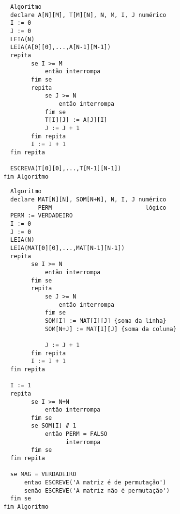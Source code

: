 \documentclass[10pt]{../notes}
\begin{document}
\pagebreak
{} 

\begin{lstlisting}
  Algoritmo
  declare A[N][M], T[M][N], N, M, I, J numérico
  I := 0
  J := 0
  LEIA(N)
  LEIA(A[0][0],...,A[N-1][M-1])
  repita
        se I >= M
            então interrompa
        fim se
        repita
            se J >= N
                então interrompa
            fim se
            T[I][J] := A[J][I] 
            J := J + 1
        fim repita        
        I := I + 1
  fim repita
  
  ESCREVA(T[0][0],...,T[M-1][N-1])
fim Algoritmo
\end{lstlisting}

\pagebreak
{} 

\begin{lstlisting}
  Algoritmo
  declare MAT[N][N], SOM[N+N], N, I, J numérico
          PERM                           lógico
  PERM := VERDADEIRO 
  I := 0
  J := 0
  LEIA(N)
  LEIA(MAT[0][0],...,MAT[N-1][N-1])
  repita
        se I >= N
            então interrompa
        fim se
        repita
            se J >= N
                então interrompa
            fim se
            SOM[I] := MAT[I][J] {soma da linha}
            SOM[N+J] := MAT[I][J] {soma da coluna}

            J := J + 1
        fim repita        
        I := I + 1
  fim repita

  I := 1
  repita
        se I >= N+N
            então interrompa
        fim se
        se SOM[I] # 1
            então PERM = FALSO
                  interrompa
        fim se
  fim repita

  se MAG = VERDADEIRO
      entao ESCREVE('A matriz é de permutação')
      senão ESCREVE('A matriz não é permutação')
  fim se 
fim Algoritmo
\end{lstlisting}
\end{document}

